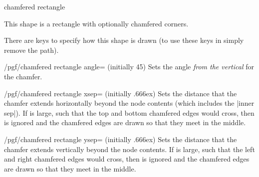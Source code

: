 \begin{shape}{chamfered rectangle}

	This shape is a rectangle with optionally chamfered corners.
	
\begin{codeexample}[]
\end{codeexample}

	There are \pgfname{} keys to specify how this shape is drawn (to use
	these keys in \tikzname{} simply remove the  path).

\begin{key}{/pgf/chamfered rectangle angle= (initially 45)}
	Sets the angle \emph{from the vertical} for the chamfer.
	
\begin{codeexample}[]
\end{codeexample}
\end{key}

\begin{key}{/pgf/chamfered rectangle xsep= (initially .666ex)}
	Sets the distance that the chamfer extends horizontally beyond the node
	contents (which includes the |inner sep|).
	If  is large, such
	that the top and bottom chamfered edges would cross, then
	 is ignored and the chamfered edges are drawn so that
	they meet in the middle.

\begin{codeexample}[]
\end{codeexample}
	
\end{key}

\begin{key}{/pgf/chamfered rectangle ysep= (initially .666ex)}
	Sets the distance that the chamfer extends vertically beyond the node
	contents.
	If  is large, such that the left and right chamfered
	edges would cross, then  is ignored and the chamfered
	edges are drawn so that	they meet in the middle.
\end{key}


\end{shape}
